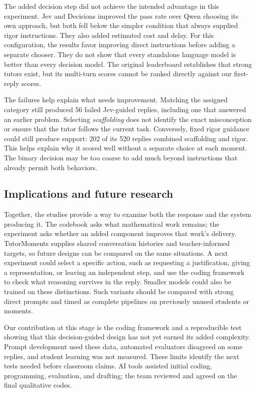 The added decision step did not achieve the intended advantage in this experiment. Jev and Decisions improved the pass rate over Qwen choosing its own approach, but both fell below the simpler condition that always supplied rigor instructions. They also added estimated cost and delay. For this configuration, the results favor improving direct instructions before adding a separate chooser. They do not show that every standalone language model is better than every decision model. The original leaderboard establishes that strong tutors exist, but its multi-turn scores cannot be ranked directly against our first-reply scores.

The failures help explain what needs improvement. Matching the assigned category still produced 56 failed Jev-guided replies, including one that answered an earlier problem. Selecting \emph{scaffolding} does not identify the exact misconception or ensure that the tutor follows the current task. Conversely, fixed rigor guidance could still produce support: 202 of its 520 replies combined scaffolding and rigor. This helps explain why it scored well without a separate choice at each moment. The binary decision may be too coarse to add much beyond instructions that already permit both behaviors.

\subsection{Implications and future research}
Together, the studies provide a way to examine both the response and the system producing it. The codebook asks what mathematical work remains; the experiment asks whether an added component improves that work's delivery. TutorMoments supplies shared conversation histories and teacher-informed targets, so future designs can be compared on the same situations. A next experiment could select a specific action, such as requesting a justification, giving a representation, or leaving an independent step, and use the coding framework to check what reasoning survives in the reply. Smaller models could also be trained on these distinctions. Such variants should be compared with strong direct prompts and timed as complete pipelines on previously unused students or moments.

Our contribution at this stage is the coding framework and a reproducible test showing that this decision-guided design has not yet earned its added complexity. Prompt development used these data, automated evaluators disagreed on some replies, and student learning was not measured. These limits identify the next tests needed before classroom claims. AI tools assisted initial coding, programming, evaluation, and drafting; the team reviewed and agreed on the final qualitative codes.
